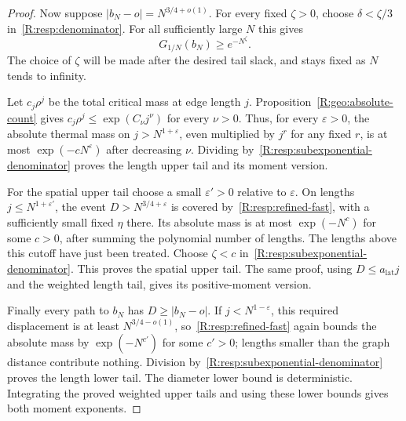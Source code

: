 \begin{proof}
Now suppose $|b_N-o|=N^{3/4+o(1)}$. For every fixed $\zeta>0$, choose $\delta<\zeta/3$ in~\eqref{R:resp:denominator}. For all sufficiently large $N$ this gives
\begin{equation}
 G_{1/N}(b_N)\ge e^{-N^\zeta}.
 \label{R:resp:subexponential-denominator}
\end{equation}
The choice of $\zeta$ will be made after the desired tail slack, and stays fixed as $N$ tends to infinity.

Let $c_j\rho^j$ be the total critical mass at edge length $j$. Proposition~\ref{R:geo:absolute-count} gives $c_j\rho^j\le\exp(C_\nu j^\nu)$ for every $\nu>0$. Thus, for every $\varepsilon>0$, the absolute thermal mass on $j>N^{1+\varepsilon}$, even multiplied by $j^r$ for any fixed $r$, is at most $\exp(-cN^\varepsilon)$ after decreasing $\nu$. Dividing by~\eqref{R:resp:subexponential-denominator} proves the length upper tail and its moment version.

For the spatial upper tail choose a small $\varepsilon'>0$ relative to $\varepsilon$. On lengths $j\le N^{1+\varepsilon'}$, the event $D>N^{3/4+\varepsilon}$ is covered by~\eqref{R:resp:refined-fast}, with a sufficiently small fixed $\eta$ there. Its absolute mass is at most $\exp(-N^c)$ for some $c>0$, after summing the polynomial number of lengths. The lengths above this cutoff have just been treated. Choose $\zeta<c$ in~\eqref{R:resp:subexponential-denominator}. This proves the spatial upper tail. The same proof, using $D\le a_{\mathrm{lat}}j$ and the weighted length tail, gives its positive-moment version.

Finally every path to $b_N$ has $D\ge|b_N-o|$. If $j<N^{1-\varepsilon}$, this required displacement is at least $N^{3/4-o(1)}$, so~\eqref{R:resp:refined-fast} again bounds the absolute mass by $\exp(-N^{c'})$ for some $c'>0$; lengths smaller than the graph distance contribute nothing. Division by~\eqref{R:resp:subexponential-denominator} proves the length lower tail. The diameter lower bound is deterministic. Integrating the proved weighted upper tails and using these lower bounds gives both moment exponents.
\end{proof}

